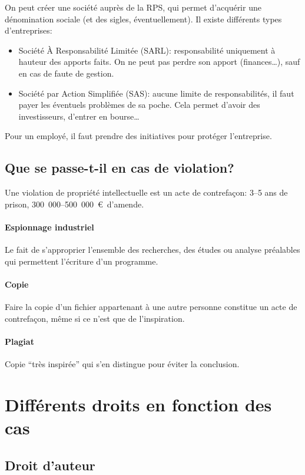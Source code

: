 \documentclass[10pt,a4paper,french]{article}
\begin{document}
On peut créer une société auprès de la RPS, qui permet d'acquérir une dénomination sociale (et des sigles, éventuellement). Il existe différents types d'entreprises:
\begin{itemize}
\item Société À Responsabilité Limitée (SARL): responsabilité uniquement à hauteur des apports faits. On ne peut pas perdre son apport (finances\ldots), sauf en cas de faute de gestion.
\item Société par Action Simplifiée (SAS): aucune limite de responsabilités, il faut payer les éventuels problèmes de sa poche. Cela permet d'avoir des investisseurs, d'entrer en bourse\ldots
\end{itemize}

Pour un employé, il faut prendre des initiatives pour protéger l'entreprise.

\subsection{Que se passe-t-il en cas de violation?}

Une violation de propriété intellectuelle est un acte de contrefaçon: 3--5 ans de prison, 300~000--500~000~\euro~d'amende.

\paragraph{Espionnage industriel}
Le fait de s'approprier l'ensemble des recherches, des études ou analyse préalables qui permettent l'écriture d'un programme.

\paragraph{Copie}
Faire la copie d'un fichier appartenant à une autre personne constitue un acte de contrefaçon, même si ce n'est que de l'inspiration.

\paragraph{Plagiat}
Copie ``très inspirée'' qui s'en distingue pour éviter la conclusion.

\section{Différents droits en fonction des cas}

\subsection{Droit d'auteur}
\end{document}
